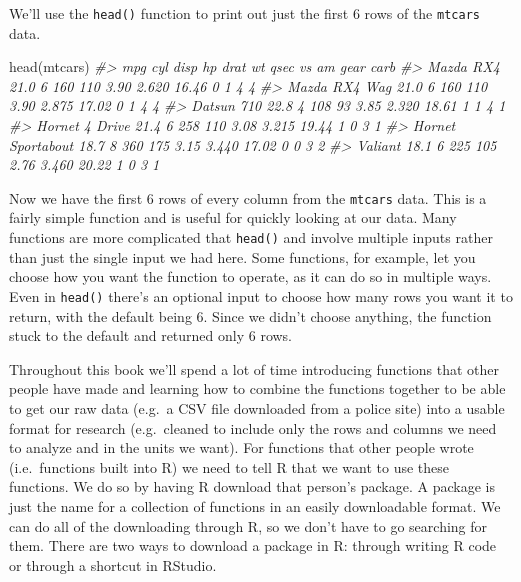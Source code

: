 \documentclass[
]{krantz}
\makeatletter
\newenvironment{Shaded}{\begin{snugshade}}{\end{snugshade}}
\newcommand{\CommentTok}[1]{\textcolor[rgb]{0.37,0.37,0.37}{\textit{#1}}}
\newcommand{\FunctionTok}[1]{\textcolor[rgb]{0,0,0}{#1}}
\newcommand{\NormalTok}[1]{#1}
\newenvironment{kframe}{%
\medskip{}
\setlength{\fboxsep}{.8em}
 \def\at@end@of@kframe{}%
 \ifinner\ifhmode%
  \def\at@end@of@kframe{\end{minipage}}%
  \begin{minipage}{\columnwidth}%
 \fi\fi%
 \def\FrameCommand##1{\hskip\@totalleftmargin \hskip-\fboxsep
 \colorbox{shadecolor}{##1}\hskip-\fboxsep
     \hskip-\linewidth \hskip-\@totalleftmargin \hskip\columnwidth}%
 \MakeFramed {\advance\hsize-\width
   \@totalleftmargin\z@ \linewidth\hsize
   \@setminipage}}%
 {\par\unskip\endMakeFramed%
 \at@end@of@kframe}
\renewenvironment{Shaded}{\begin{kframe}}{\end{kframe}}
\makeatother
\begin{document}
We'll use the \texttt{head()} function to print out just the first 6 rows of the \texttt{mtcars} data.

\begin{Shaded}
\begin{Highlighting}[]
\FunctionTok{head}\NormalTok{(mtcars)}
\CommentTok{\#\textgreater{}                    mpg cyl disp  hp drat    wt  qsec vs am gear carb}
\CommentTok{\#\textgreater{} Mazda RX4         21.0   6  160 110 3.90 2.620 16.46  0  1    4    4}
\CommentTok{\#\textgreater{} Mazda RX4 Wag     21.0   6  160 110 3.90 2.875 17.02  0  1    4    4}
\CommentTok{\#\textgreater{} Datsun 710        22.8   4  108  93 3.85 2.320 18.61  1  1    4    1}
\CommentTok{\#\textgreater{} Hornet 4 Drive    21.4   6  258 110 3.08 3.215 19.44  1  0    3    1}
\CommentTok{\#\textgreater{} Hornet Sportabout 18.7   8  360 175 3.15 3.440 17.02  0  0    3    2}
\CommentTok{\#\textgreater{} Valiant           18.1   6  225 105 2.76 3.460 20.22  1  0    3    1}
\end{Highlighting}
\end{Shaded}

Now we have the first 6 rows of every column from the \texttt{mtcars} data. This is a fairly simple function and is useful for quickly looking at our data. Many functions are more complicated that \texttt{head()} and involve multiple inputs rather than just the single input we had here. Some functions, for example, let you choose how you want the function to operate, as it can do so in multiple ways. Even in \texttt{head()} there's an optional input to choose how many rows you want it to return, with the default being 6. Since we didn't choose anything, the function stuck to the default and returned only 6 rows.

Throughout this book we'll spend a lot of time introducing functions that other people have made and learning how to combine the functions together to be able to get our raw data (e.g.~a CSV file downloaded from a police site) into a usable format for research (e.g.~cleaned to include only the rows and columns we need to analyze and in the units we want). For functions that other people wrote (i.e.~functions built into R) we need to tell R that we want to use these functions. We do so by having R download that person's package. A package is just the name for a collection of functions in an easily downloadable format. We can do all of the downloading through R, so we don't have to go searching for them. There are two ways to download a package in R: through writing R code or through a shortcut in RStudio.
\end{document}
